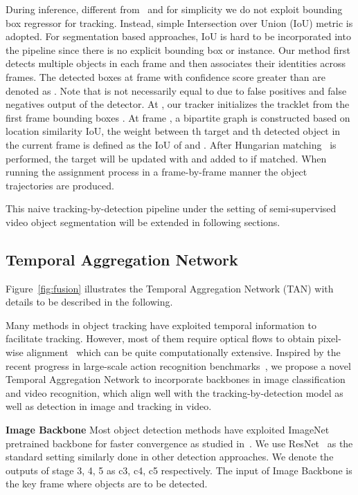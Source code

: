 \documentclass[10pt,twocolumn,letterpaper]{article}
\begin{document}
During inference, different from~\cite{bergmann2019tracking} and for simplicity we do  not exploit bounding box regressor for tracking.
Instead, simple Intersection over Union (IoU) metric is adopted.
For segmentation based approaches, IoU is hard to be incorporated into the pipeline since there is no explicit bounding box or instance.
Our method first detects multiple objects in each frame and then associates their identities across frames.
The detected boxes at frame  with confidence score greater than  are denoted as .
Note that  is not necessarily equal to  due to false positives and false negatives output of the detector.
At , our tracker initializes the tracklet from the first frame bounding boxes .
At frame , a bipartite graph is constructed based on location similarity IoU, the weight  between th target and th detected object in the current frame is defined as the IoU of  and .
After Hungarian matching~\cite{munkres1957algorithms} is performed, the target  will be updated with  and added to  if matched.
When running the assignment process in a frame-by-frame manner the object trajectories are produced.

This naive tracking-by-detection pipeline under the setting of semi-supervised video object segmentation will be extended in following sections.

\subsection{Temporal Aggregation Network}
Figure~\ref{fig:fusion} illustrates the Temporal Aggregation Network (TAN) with  details to be described in the following.

Many methods in object tracking have exploited temporal information to facilitate tracking.
However, most of them require optical flows to obtain pixel-wise alignment~\cite{zhu2017dff, zhu2017fgfa} which can be quite computationally extensive.
Inspired by the recent progress in large-scale action recognition benchmarks~\cite{carreira2017i3d, gu2018ava}, we propose a novel Temporal Aggregation Network to incorporate backbones in image classification and video recognition, which align well with the tracking-by-detection model as well as detection in image and tracking in video.

\textbf{Image Backbone}
Most object detection methods have exploited ImageNet~\cite{deng2009imagenet} pretrained backbone for faster convergence as studied in~\cite{he2018rethinking}.
We use ResNet~\cite{he2016resnet} as the standard setting similarly done in other detection approaches.
We denote the outputs of stage 3, 4, 5 as c3, c4, c5 respectively.
The input of Image Backbone is the key frame where objects are to be detected.
\end{document}

